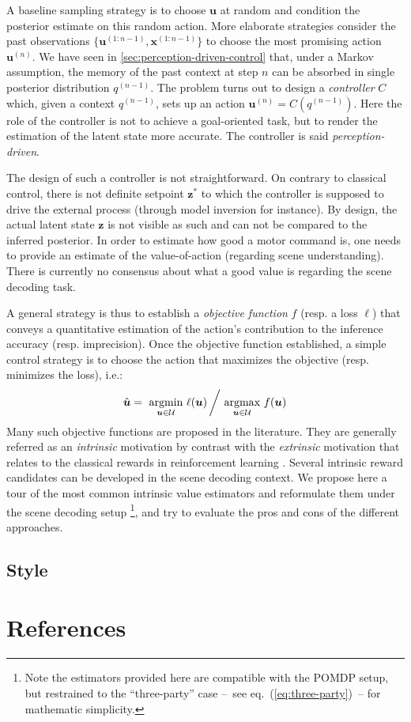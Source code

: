 \documentclass{article}
\begin{document}
A baseline sampling strategy is to choose $\boldsymbol{u}$ at random and condition the posterior  estimate on this random action. 
More elaborate strategies consider the past observations $\{\boldsymbol{u}^{(1:n-1)}, \boldsymbol{x}^{(1:n-1)}\}$ to choose the most promising action $\boldsymbol{u}^{(n)}$. We have seen in  \ref{sec:perception-driven-control} that, under a Markov assumption, the memory of the past context
at step $n$ can be absorbed in single posterior distribution $q^{(n-1)}$.  The problem turns out to design  a \emph{controller} $C$ which, given a context $q^{(n-1)}$, sets up an action $\boldsymbol{u}^{(n)} = C(q^{(n-1)})$. Here the role of the controller is not to achieve a goal-oriented task, but to render the estimation of the latent state more accurate. The controller is said \emph{perception-driven}. 

The design of such a controller is not straightforward. On contrary to classical control, there is not definite setpoint $\boldsymbol{z}^*$ to which the controller is supposed to drive the external process (through model inversion for instance). By design, the actual latent state $\boldsymbol{z}$ is not visible as such and can not be compared to the inferred posterior. In order to estimate how good a motor command is, one needs to provide an estimate of the value-of-action (regarding scene understanding). There is currently no consensus about what a good value is regarding the scene decoding task. 

A general strategy is thus to establish a \emph{objective function} $f$ (resp. a loss $\ell$) that conveys a quantitative estimation of the action's contribution to the inference accuracy (resp. imprecision). Once the objective function established, a simple control strategy is to choose the action that maximizes the objective (resp. minimizes the loss), i.e.:
\begin{align}
\hat{\boldsymbol{u}} = \underset{\boldsymbol{u}\in\mathcal{U}}{\text{ argmin }}  \ell(\boldsymbol{u})\left/ \underset{\boldsymbol{u}\in\mathcal{U}}{\text{ argmax }}  f(\boldsymbol{u})\right.
\end{align}
Many such objective functions are proposed in the literature. They are generally referred as an \emph{intrinsic} motivation \cite{oudeyer2008can} by contrast with the \emph{extrinsic} motivation that relates to the classical rewards in reinforcement learning \cite{sutton1998reinforcement}. Several intrinsic reward candidates can be developed in the scene decoding context.
We propose here a tour of the most common intrinsic value estimators and reformulate them under the scene decoding setup \footnote{Note the estimators provided here are compatible with the POMDP setup, but restrained to the ``three-party'' case --~see eq.~(\ref{eq:three-party})~-- for mathematic simplicity.}, and try to evaluate the pros and cons of the different approaches.



\subsection{Style}


\section*{References}


\end{document}
